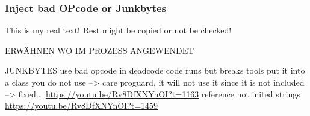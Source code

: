 \subsubsection{Inject bad OPcode or Junkbytes} \label{subsubsection:counter-reengineering-break-inject}
This is my real text! Rest might be copied or not be checked!

ERWÄHNEN WO IM PROZESS ANGEWENDET\newline

JUNKBYTES\newline
use bad opcode in deadcode \newline
code runs but breaks tools\newline
put it into a class you do not use --> care proguard, it will not use it since it is not included\newline
--> fixed...\newline
\url{https://youtu.be/Rv8DfXNYnOI?t=1163}\newline
reference not inited strings\newline
\url{https://youtu.be/Rv8DfXNYnOI?t=1459}
